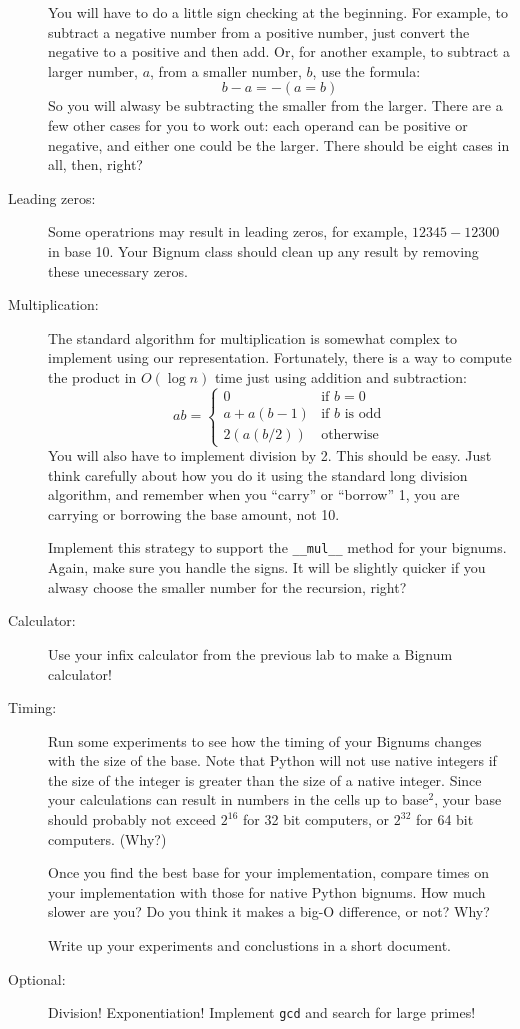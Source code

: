 \documentclass{article}
\begin{document}
\begin{description}
You will have to do a little sign checking at the beginning.  For example,
to subtract a negative number from a positive number, just convert the negative
to a positive and then add.  Or, for another example, 
to subtract a larger number, $a$, from a smaller number, $b$, use the formula:
\[
b - a = -(a = b)
\]
So you will alwasy be subtracting the smaller from the larger.   There are a few
other cases for you to work out: each operand can be positive or negative,
and either one could be the larger.  There should be eight cases in all, then, right?

\item[Leading zeros:]  Some operatrions may result in leading zeros, for example,
$12345 - 12300$ in base 10.  Your Bignum class should clean up any result
by removing these unecessary zeros.


\item[Multiplication:]
The standard algorithm for multiplication is somewhat complex to implement
using our representation.  Fortunately, there is a way to compute the product
in $O(\log n)$ time just using addition and subtraction:
\[
ab = \left\{\begin{array}{ll}
0    &  \mbox{if $b=0$}\\
a + a(b-1)  & \mbox{if $b$ is odd}\\
2(a(b/2)) &\mbox{otherwise}
\end{array}\right.
\]
You will also have to implement division by 2.  This should be easy.  Just think
carefully about how you do it using the standard long division algorithm, and
remember when you ``carry'' or ``borrow'' 1, you are carrying or borrowing
the base amount, not 10.

Implement this strategy to support the \lstinline{__mul__} method for your
bignums.  Again, make sure you handle the signs.  It will be slightly quicker if
you alwasy choose the smaller number for the recursion, right?

\item[Calculator:] Use your infix calculator from the previous lab to
make a Bignum calculator!

\item[Timing:]  Run some experiments to see how the timing of your
Bignums changes with the size of the base.  Note that Python will
not use native integers if the size of the integer is greater 
than the size of a native integer.  Since your calculations can result
in numbers in the cells up to base$^2$, your base should probably
not exceed $2^{16}$ for 32 bit computers, or $2^{32}$ for 64 bit
computers.  (Why?)

Once you find the best base for your implementation, compare
times on your implementation with those for native Python bignums.
How much slower are you?  Do you think it makes a big-O difference,
or not?  Why?

Write up your experiments and conclustions in a short document.

\item[Optional:]  Division!  Exponentiation!  Implement \lstinline{gcd} and search for
large primes!
    
\end{description}
\end{document}

